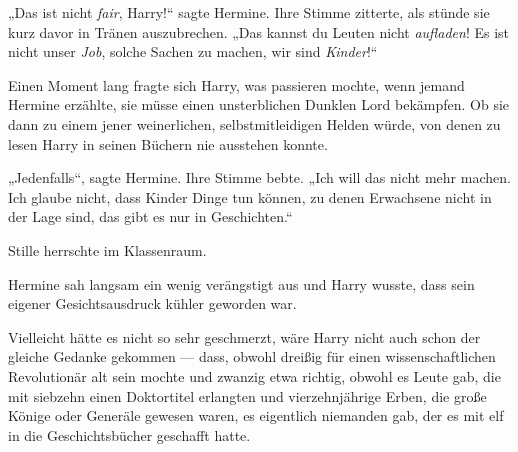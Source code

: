 „Das ist nicht \emph{fair}, Harry!“ sagte Hermine. Ihre Stimme zitterte, als stünde sie kurz davor in Tränen auszubrechen.
„Das kannst du Leuten nicht \emph{aufladen}! Es ist nicht unser \emph{Job}, solche Sachen zu machen, wir sind \emph{Kinder}!“

Einen Moment lang fragte sich Harry, was passieren mochte, wenn jemand Hermine erzählte, sie müsse einen unsterblichen Dunklen Lord bekämpfen. Ob sie dann zu einem jener weinerlichen, selbstmitleidigen Helden würde, von denen zu lesen Harry in seinen Büchern nie ausstehen konnte.

„Jedenfalls“, sagte Hermine. Ihre Stimme bebte.
„Ich will das nicht mehr machen. Ich glaube nicht, dass Kinder Dinge tun können, zu denen Erwachsene nicht in der Lage sind, das gibt es nur in Geschichten.“

Stille herrschte im Klassenraum.

Hermine sah langsam ein wenig verängstigt aus und Harry wusste, dass sein eigener Gesichtsausdruck kühler geworden war.

Vielleicht hätte es nicht so sehr geschmerzt, wäre Harry nicht auch schon der gleiche Gedanke gekommen — dass, obwohl dreißig für einen wissenschaftlichen Revolutionär alt sein mochte und zwanzig etwa richtig, obwohl es Leute gab, die mit siebzehn einen Doktortitel erlangten und vierzehnjährige Erben, die große Könige oder Generäle gewesen waren, es eigentlich niemanden gab, der es mit elf in die Geschichtsbücher geschafft hatte.

